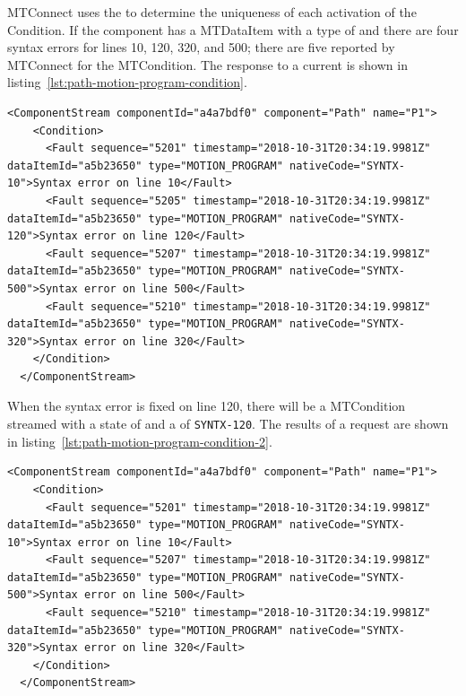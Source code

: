 MTConnect uses the  to determine the uniqueness of each activation of the Condition. If the  component has a \gls{MTDataItem} with a \gls{type} of  and there are four syntax errors for lines 10, 120, 320, and 500; there are five  reported by MTConnect for the \gls{MTCondition}. The response to a \gls{current} is shown in listing~\ref{lst:path-motion-program-condition}.

\begin{lstlisting}[firstnumber=last,escapechar=|,%
    caption={Path Motion Program Syntax Errors},label={lst:path-motion-program-condition}]
  <ComponentStream componentId="a4a7bdf0" component="Path" name="P1">
    <Condition>
      <Fault sequence="5201" timestamp="2018-10-31T20:34:19.9981Z" dataItemId="a5b23650" type="MOTION_PROGRAM" nativeCode="SYNTX-10">Syntax error on line 10</Fault>
      <Fault sequence="5205" timestamp="2018-10-31T20:34:19.9981Z" dataItemId="a5b23650" type="MOTION_PROGRAM" nativeCode="SYNTX-120">Syntax error on line 120</Fault>
      <Fault sequence="5207" timestamp="2018-10-31T20:34:19.9981Z" dataItemId="a5b23650" type="MOTION_PROGRAM" nativeCode="SYNTX-500">Syntax error on line 500</Fault>
      <Fault sequence="5210" timestamp="2018-10-31T20:34:19.9981Z" dataItemId="a5b23650" type="MOTION_PROGRAM" nativeCode="SYNTX-320">Syntax error on line 320</Fault>
    </Condition>
  </ComponentStream>
\end{lstlisting}

When the syntax error is fixed on line 120, there will be a \gls{MTCondition} streamed with a state of  and a  of \texttt{SYNTX-120}. The results of a  request are shown in listing~\ref{lst:path-motion-program-condition-2}.

\begin{lstlisting}[firstnumber=last,escapechar=|,%
    caption={Path Motion Program Clearing Syntax Error on Line 120},label={lst:path-motion-program-condition-2}]
  <ComponentStream componentId="a4a7bdf0" component="Path" name="P1">
    <Condition>
      <Fault sequence="5201" timestamp="2018-10-31T20:34:19.9981Z" dataItemId="a5b23650" type="MOTION_PROGRAM" nativeCode="SYNTX-10">Syntax error on line 10</Fault>
      <Fault sequence="5207" timestamp="2018-10-31T20:34:19.9981Z" dataItemId="a5b23650" type="MOTION_PROGRAM" nativeCode="SYNTX-500">Syntax error on line 500</Fault>
      <Fault sequence="5210" timestamp="2018-10-31T20:34:19.9981Z" dataItemId="a5b23650" type="MOTION_PROGRAM" nativeCode="SYNTX-320">Syntax error on line 320</Fault>
    </Condition>
  </ComponentStream>
\end{lstlisting}

